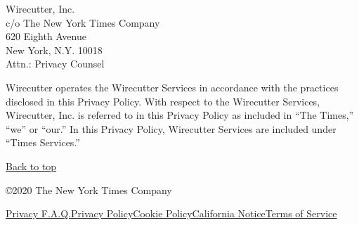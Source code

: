 Wirecutter, Inc.\\
c/o The New York Times Company\\
620 Eighth Avenue\\
New York, N.Y. 10018\\
Attn.: Privacy Counsel

Wirecutter operates the Wirecutter Services in accordance with the
practices disclosed in this Privacy Policy. With respect to the
Wirecutter Services, Wirecutter, Inc. is referred to in this Privacy
Policy as included in ``The Times,'' ``we'' or ``our.'' In this Privacy
Policy, Wirecutter Services are included under ``Times Services.''

\href{app}{Back to top}

©2020 The New York Times Company

\href{/privacy}{Privacy F.A.Q.}\href{/privacy/privacy-policy}{Privacy
Policy}\href{/privacy/cookie-policy}{Cookie
Policy}\href{/privacy/california-notice}{California
Notice}\href{https://help.nytimes.com/hc/en-us/articles/115014893428-Terms-of-service}{Terms
of Service}
